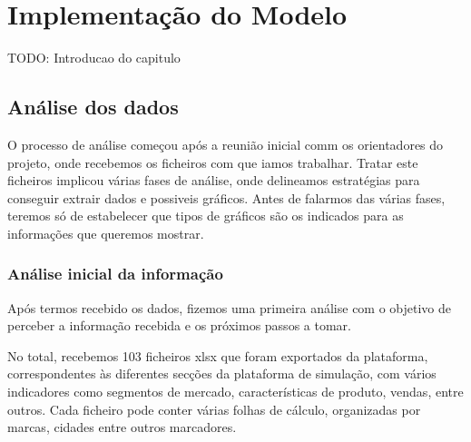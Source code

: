 

\chapter{Implementação do Modelo}
\label{ch:implementacaoDoModelo}

TODO: Introducao do capitulo

\section{Análise dos dados}

O processo de análise começou após a reunião inicial comm os orientadores do projeto, onde recebemos os ficheiros com que iamos trabalhar. Tratar este ficheiros implicou várias fases de análise, onde delineamos estratégias para conseguir extrair dados e possiveis gráficos. Antes de falarmos das várias fases, teremos só de estabelecer que tipos de gráficos são os indicados para as informações que queremos mostrar.

\subsection{Análise inicial da informação}
Após termos recebido os dados, fizemos uma primeira análise com o objetivo de perceber a informação recebida e os próximos passos a tomar.

No total, recebemos 103 ficheiros \gls{xlsx} que foram exportados da plataforma, correspondentes às diferentes secções da plataforma de simulação, com vários indicadores como segmentos de mercado, características de produto, vendas, entre outros. Cada ficheiro pode conter várias folhas de cálculo, organizadas por marcas, cidades entre outros marcadores.

